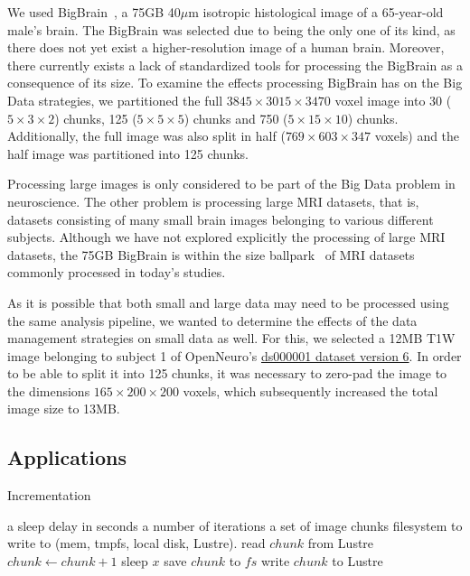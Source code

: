 \documentclass{IEEEtran}
\newcommand{\Desc}[2]{\State \makebox[2em][l]{#1}#2}
\begin{document}
We used BigBrain~\cite{amunts2013bigbrain}, a 75GB 40$\mu$m isotropic 
histological image of a 65-year-old male's brain. The BigBrain was selected due 
to being the only one of its kind, as there does not yet exist a 
higher-resolution image of a human brain. Moreover, there currently exists a 
lack of standardized tools for processing the BigBrain as a consequence 
of its size. To examine the effects processing BigBrain has on the Big Data 
strategies, we partitioned the full $3845\times3015\times3470$ voxel image into 30 ($5\times3\times2$)
chunks, 125 ($5\times5\times5$) chunks and 750 ($5\times15\times10$) chunks. Additionally, the full 
image was also split in half ($769\times603\times347$ voxels) and the half image was 
partitioned into 125 chunks.

Processing large images is only considered to be part of the Big Data problem 
in neuroscience. The other problem is processing large MRI datasets, that is,
datasets consisting of many small brain images belonging to various different 
subjects. Although we have not explored explicitly the processing of large MRI
datasets, the 75GB BigBrain is within the size ballpark~\cite{van2014human} of 
MRI datasets commonly processed in today's studies.

As it is possible that both small and large data may need to be processed using
the same analysis pipeline, we 
wanted to determine the effects of the data management strategies on small 
data as well. For this, we selected a 12MB T1W image belonging to 
subject 1 of OpenNeuro's 
\href{https://openneuro.org/datasets/ds000001/versions/00006/file-display/sub-01:anat:sub-01_T1w.nii.gz}{ds000001 
dataset version 6}. In order to be able to split it into 125 chunks, it 
was necessary to zero-pad the image to the dimensions
$165\times200\times200$ voxels, which subsequently increased the total image size to 13MB.

\subsection{Applications} %
\begin{algorithm}\caption{Incrementation}\label{alg:incrementation}
    \begin{algorithmic}[1]
    \Input
    \Desc{$x$}{a sleep delay in seconds}
    \Desc{$n$}{a number of iterations}
    \Desc{$C$}{a set of image chunks}
    \Desc{$fs$}{filesystem to write to (mem, tmpfs, local disk, Lustre).}
    \EndInput
    \State read $chunk$ from Lustre
        \State $chunk\gets chunk+1$
        \State sleep $x$
        \State save $chunk$ to $fs$
        \EndIf
    \EndFor
    \State write $chunk$ to Lustre
    \EndFor
\end{algorithmic}
\end{algorithm}
\end{document}
